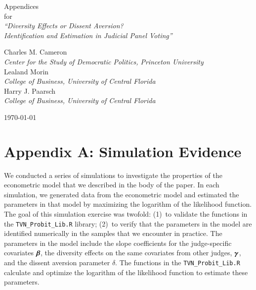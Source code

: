 \documentclass[11pt]{paper}
\begin{document}
\phantom{0}
\vspace{1.0in}


\begin{centering}

{\huge 
Appendices  \\
\bigskip
for \\
\bigskip
{\it ``Diversity Effects or Dissent Aversion? \\
Identification and Estimation in Judicial Panel Voting''} \\
}

\vspace{1.25in}


{\large 
Charles M. Cameron \\
{\it Center for the Study of Democratic Politics, Princeton University} \\
\medskip
Lealand Morin \\
{\it College of Business, University of Central Florida} \\
\medskip
Harry J. Paarsch \\
{\it College of Business, University of Central Florida} \\
}

\vspace{1.25in}



\today

\end{centering}


\pagebreak

\section{Appendix A: Simulation Evidence}

We conducted a series of simulations to investigate the properties of the 
econometric model that we described in the body of the paper. 
In each simulation, we generated data from the econometric model and estimated 
the parameters in that model by maximizing the logarithm of the likelihood 
function. 
The goal of this simulation exercise was twofold: (1)~to validate the 
functions in the \texttt{TVN\_Probit\_Lib.R} library; (2)~to verify that 
the parameters in the model are identified numerically in the samples that
we encounter in practice.
The parameters in the model include the slope coefficients for the 
judge-specific covariates $\boldsymbol{\beta}$, the diversity effects on the same 
covariates from other judges, $\boldsymbol{\gamma}$, and the dissent aversion parameter
$\delta$. 
The functions in the \texttt{TVN\_Probit\_Lib.R} calculate and optimize the 
logarithm of the likelihood function to estimate these parameters. 
\end{document}
